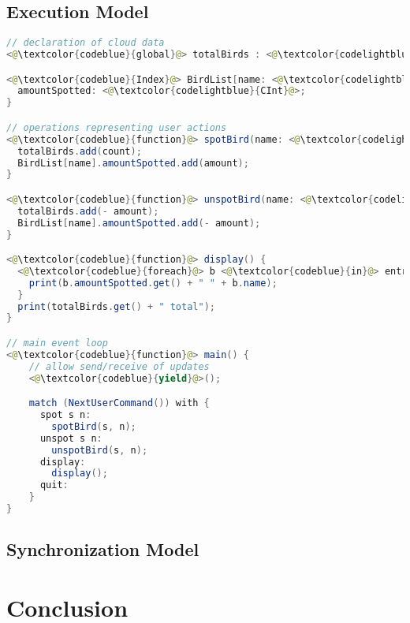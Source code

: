 \documentclass[a4paper,12pt]{report}
\begin{document}
\section{Execution Model}\label{sec:ExecutionModel}

\newpage
%

\begin{lstlisting}[language=Java,caption={A simple birdwatching application implemented in Cloud Types pseudo-language}]
// declaration of cloud data
<@\textcolor{codeblue}{global}@> totalBirds : <@\textcolor{codelightblue}{CInt}@>;

<@\textcolor{codeblue}{Index}@> BirdList[name: <@\textcolor{codelightblue}{String}@>] {
  amountSpotted: <@\textcolor{codelightblue}{CInt}@>;
}

// operations representing user actions
<@\textcolor{codeblue}{function}@> spotBird(name: <@\textcolor{codelightblue}{String}@>, amount: <@\textcolor{codelightblue}{Int}@>) {
  totalBirds.add(count);
  BirdList[name].amountSpotted.add(amount);
}

<@\textcolor{codeblue}{function}@> unspotBird(name: <@\textcolor{codelightblue}{String}@>, amount: <@\textcolor{codelightblue}{Int}@>) {
  totalBirds.add(- amount);
  BirdList[name].amountSpotted.add(- amount);
}

<@\textcolor{codeblue}{function}@> display() {
  <@\textcolor{codeblue}{foreach}@> b <@\textcolor{codeblue}{in}@> entries BirdList.amountSpotted {
    print(b.amountSpotted.get() + " " + b.name);
  }
  print(totalBirds.get() + " total");
}

// main event loop
<@\textcolor{codeblue}{function}@> main() {
    // allow send/receive of updates
    <@\textcolor{codeblue}{yield}@>();

    match (NextUserCommand()) with {
      spot s n:
        spotBird(s, n);
      unspot s n:
        unspotBird(s, n);
      display:
        display();
      quit:
    } 
}
\end{lstlisting}

\section{Synchronization Model}\label{sec:SynchronizationModel}

\chapter{Conclusion}\label{cha:Conclusion} %
\end{document}
